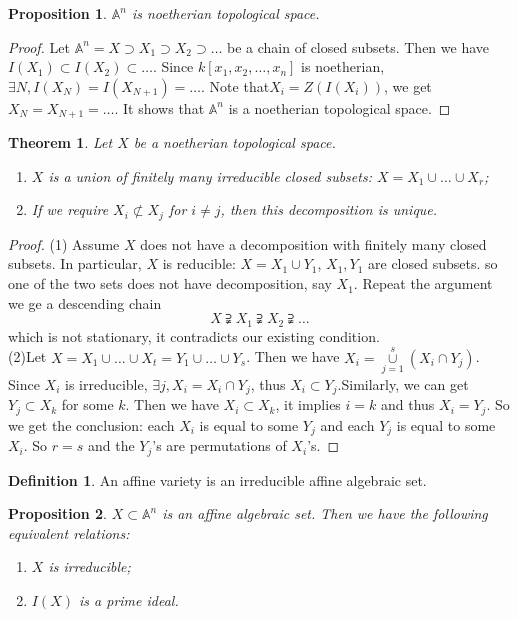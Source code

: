 \documentclass{amsart}
\theoremstyle{plain}
\newtheorem{theorem}{Theorem}
\newtheorem{proposition}{Proposition}
\theoremstyle{definition}
\newtheorem{definition}{Definition}
\theoremstyle{remark}
\numberwithin{equation}{section}
\begin{document}
\begin{proposition}
	$ \mathbb{A}^n $ is noetherian topological space.
\end{proposition}
\begin{proof}
	Let $ \mathbb{A}^n=X\supset X_1\supset X_2\supset \dots $ be a chain of closed subsets. Then we have $ I(X_1)\subset I(X_2)\subset \dots $. Since $ k[x_1,x_2,\dots,x_n] $ is noetherian, $ \exists N, I(X_N)=I(X_{N+1})=\dots $. Note that$ X_i=Z(I(X_i)) $, we get $ X_N=X_{N+1}=\dots $. It shows that $ \mathbb{A}^n $ is a noetherian topological space.
\end{proof}
\begin{theorem}
	Let $ X $ be a noetherian topological space.
	\begin{enumerate}
		\item $ X $ is a union of finitely many irreducible closed subsets: $X=X_1\cup\dots\cup X_r  $;
		\item If we require $ X_i\not\subset X_j  $ for $ i\neq j $, then this decomposition is unique.
	\end{enumerate}
\end{theorem}
\begin{proof}
	(1) Assume $ X $ does not have a decomposition with finitely many closed subsets. In particular, $ X $ is reducible: $ X=X_1\cup Y_1 $, $ X_1,Y_1 $ are closed subsets. so one of the two sets does not have decomposition, say $ X_1 $. Repeat the argument we ge a descending chain
	$$
	X\supsetneqq X_1\supsetneqq X_2\supsetneqq \dots
	$$
	which is not stationary, it contradicts our existing condition.\\
	(2)Let $ X=X_1\cup \dots\cup X_t = Y_1\cup\dots\cup Y_s$. Then we have $ X_i = \mathop{\cup}\limits_{j=1}^{s}(X_i\cap Y_j)$. Since $ X_i $ is irreducible, $ \exists j, X_i=X_i\cap Y_j $, thus $ X_i\subset Y_j $.Similarly, we can get $ Y_j\subset X_k $ for some $ k $. Then we have $ X_i\subset X_k $, it implies $ i=k $ and thus $ X_i = Y_j $. So we get the conclusion: each $ X_i $ is equal to some $ Y_j $ and each $ Y_j $ is equal to some $ X_i $. So $ r=s $ and the $ Y_j $'s are permutations of $ X_i $'s.
\end{proof}
\begin{definition}
	An affine variety is an irreducible affine algebraic set.
\end{definition}
\begin{proposition}\label{5}
	$ X\subset \mathbb{A}^n $ is an affine algebraic set. Then we have the following equivalent relations:
	\begin{enumerate}
		\item $ X $ is irreducible;
		\item $ I(X) $ is a prime ideal.
	\end{enumerate}
\end{proposition}
\end{document}
